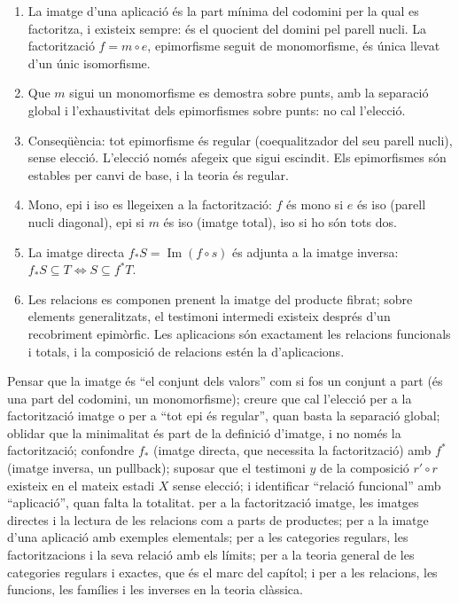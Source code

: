 \begin{resumcap}
\begin{enumerate}
  \item La imatge d'una aplicació és la part mínima del codomini per la qual es factoritza, i existeix sempre: és el quocient del domini pel parell nucli. La factorització \(f=m\circ e\), epimorfisme seguit de monomorfisme, és única llevat d'un únic isomorfisme.
  \item Que \(m\) sigui un monomorfisme es demostra sobre punts, amb la separació global i l'exhaustivitat dels epimorfismes sobre punts: no cal l'elecció.
  \item Conseqüència: tot epimorfisme és regular (coequalitzador del seu parell nucli), sense elecció. L'elecció només afegeix que sigui escindit. Els epimorfismes són estables per canvi de base, i la teoria és regular.
  \item Mono, epi i iso es llegeixen a la factorització: \(f\) és mono si \(e\) és iso (parell nucli diagonal), epi si \(m\) és iso (imatge total), iso si ho són tots dos.
  \item La imatge directa \(f_*S=\operatorname{Im}(f\circ s)\) és adjunta a la imatge inversa: \(f_*S\subseteq T\iff S\subseteq f^*T\).
  \item Les relacions es componen prenent la imatge del producte fibrat; sobre elements generalitzats, el testimoni intermedi existeix després d'un recobriment epimòrfic. Les aplicacions són exactament les relacions funcionals i totals, i la composició de relacions estén la d'aplicacions.
\end{enumerate}
 Pensar que la imatge és \enquote{el conjunt dels valors} com si fos un conjunt a part (és una part del codomini, un monomorfisme); creure que cal l'elecció per a la factorització imatge o per a \enquote{tot epi és regular}, quan basta la separació global; oblidar que la minimalitat és part de la definició d'imatge, i no només la factorització; confondre \(f_*\) (imatge directa, que necessita la factorització) amb \(f^*\) (imatge inversa, un pullback); suposar que el testimoni \(y\) de la composició \(r'\circ r\) existeix en el mateix estadi \(X\) sense elecció; i identificar \enquote{relació funcional} amb \enquote{aplicació}, quan falta la totalitat.
 \cite[§§4.3--4.5 i cap.~5]{lawvere-rosebrugh} per a la factorització imatge, les imatges directes i la lectura de les relacions com a parts de productes; \cite[article~IV, sessions~22--23]{lawvere-schanuel} per a la imatge d'una aplicació amb exemples elementals; \cite[§§5.3--5.4 i §§9.6--9.7]{awodey} per a les categories regulars, les factoritzacions i la seva relació amb els límits; \cite[cap.~2]{borceux-vol2} per a la teoria general de les categories regulars i exactes, que és el marc del capítol; i \cite[§§7--10]{halmos} per a les relacions, les funcions, les famílies i les inverses en la teoria clàssica.
\end{resumcap}
